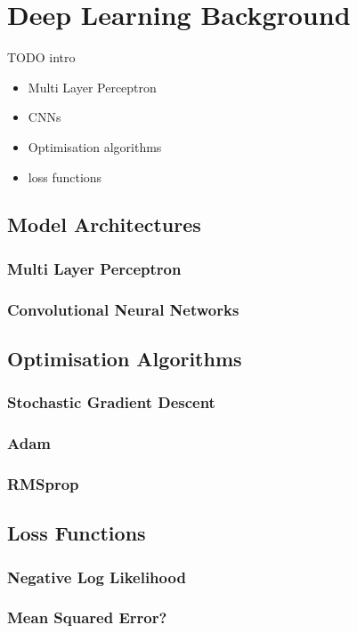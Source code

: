 \documentclass[12pt]{report}
\begin{document}
\chapter{Deep Learning Background}
TODO intro

\begin{itemize}
    \item Multi Layer Perceptron
    \item CNNs
    \item Optimisation algorithms
    \item loss functions
\end{itemize}

\section{Model Architectures}
\subsection{Multi Layer Perceptron}
\subsection{Convolutional Neural Networks}

\section{Optimisation Algorithms}
\subsection{Stochastic Gradient Descent}
\subsection{Adam}
\subsection{RMSprop}

\section{Loss Functions}
\subsection{Negative Log Likelihood}
\subsection{Mean Squared Error?}



\end{document}
